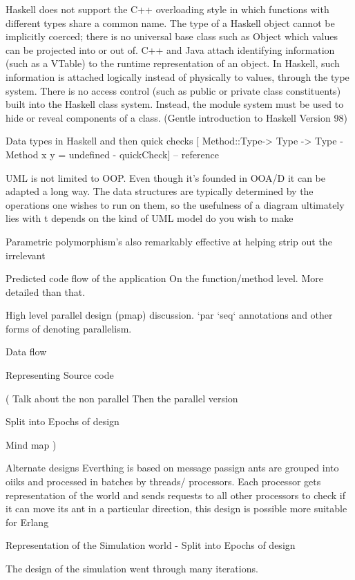 \documentclass[main.tex]{subfiles}
\begin{document}
Haskell does not support the C++ overloading style in which functions with different types share a common name.
The type of a Haskell object cannot be implicitly coerced; there is no universal base class such as Object which values can be projected into or out of.
C++ and Java attach identifying information (such as a VTable) to the runtime representation of an object. In Haskell, such information is attached logically instead of physically to values, through the type system.
There is no access control (such as public or private class constituents) built into the Haskell class system. Instead, the module system must be used to hide or reveal components of a class.
(Gentle introduction to Haskell Version 98)


Data types in Haskell and then quick checks [ Method::Type-> Type -> Type  - Method x y = undefined  - quickCheck]
-- reference

UML is not limited to OOP. Even though it's founded in OOA/D it can be adapted a long way. The data structures are typically determined by the operations one wishes to run on them, so the usefulness of a diagram ultimately lies with t depends on the kind of UML model do you wish to make

Parametric polymorphism's also remarkably effective at helping strip out the irrelevant

Predicted code flow of the application
On the function/method level.
More detailed than that.


High level parallel design (pmap) discussion.
`par `seq` annotations and other forms of denoting parallelism.

Data flow

Representing Source code

(
Talk about the non parallel
Then the parallel version

Split into Epochs of design

Mind map
)

Alternate designs
Everthing is based on message passign ants are grouped into oiiks and processed in batches by threads/ processors. Each processor gets representation of the world and sends requests to all other processors to check if it can move its ant in a particular direction, this design is possible more suitable for Erlang



Representation of the Simulation world - Split into Epochs of design

The design of the simulation went through many iterations.
\end{document}
